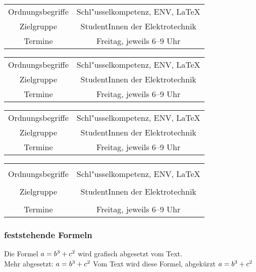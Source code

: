 \documentclass[a4paper,12pt,titlepage]{article} %
\begin{document}
\begin{tabular}{|c|c|} %
 \hline
 Ordnungsbegriffe &
 Schl"usselkompetenz, ENV, \LaTeX \\
 Zielgruppe &
 StudentInnen der Elektrotechnik \\
 Termine & Freitag, jeweils 6--9 Uhr \\
 \hline
\end{tabular}

\begin{center}
 \begin{tabular}{|c|c|} %
 \hline
 Ordnungsbegriffe &
 Schl"usselkompetenz, ENV, \LaTeX \\
 Zielgruppe &
 StudentInnen der Elektrotechnik \\
 Termine & Freitag, jeweils 6--9 Uhr \\
 \hline
\end{tabular}
\end{center}
\vspace*{2ex}

\begin{center}
 \begin{tabular}{|c|c|} %
 \hline
 Ordnungsbegriffe &
 Schl"usselkompetenz, ENV, \LaTeX \\
 \hhline{|=|=|} %
 Zielgruppe &
 StudentInnen der Elektrotechnik \\
 Termine & Freitag, jeweils 6--9 Uhr \tabularnewline[3ex]
 \hline
\end{tabular}
\end{center}
\vspace*{2ex}

\begin{center}
 \begin{tabular}{|c|c|} %
 \hline
 &
 \tabularnewline[1ex]
 Ordnungsbegriffe &
 Schl"usselkompetenz, ENV, \LaTeX \\
 \hhline{|=|=|} %
  &
 \tabularnewline[1ex]
 Zielgruppe &
 StudentInnen der Elektrotechnik \\
  &
 \tabularnewline[1ex]
 Termine & Freitag, jeweils 6--9 Uhr \tabularnewline[3ex]
 \hline
\end{tabular}
\end{center}
\vspace*{2ex}

\subsubsection{feststehende Formeln}
Die Formel $a = b\textsuperscript{3} + c\textsuperscript{2}$ wird grafisch abgesetzt vom Text.\\
Mehr abgesetzt:
\begin{math}
 a = b\textsuperscript{3} + c\textsuperscript{2}
\end{math}
Vom Text wird diese Formel, abgekürzt
\(
a = b\textsuperscript{3} + c\textsuperscript{2}
\)
\end{document}
